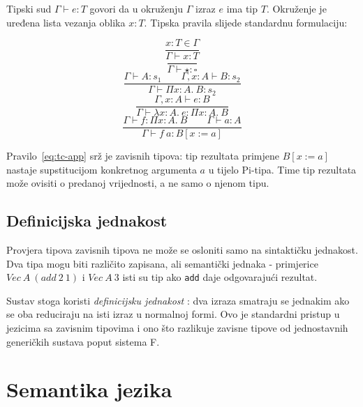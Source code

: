 \documentclass[diplomskirad,upload]{fer}
\begin{document}
Tipski sud \(\Gamma \vdash e : T\) govori da u okruženju \(\Gamma\) izraz
\(e\) ima tip \(T\). Okruženje je uređena lista vezanja oblika \(x : T\).
Tipska pravila slijede standardnu formulaciju:

\begin{equation}
    \frac{x : T \in \Gamma}{\Gamma \vdash x : T}
\end{equation}
\begin{equation}
    \frac{}{\Gamma \vdash \star : \square}
\end{equation}
\begin{equation}
    \frac{\Gamma \vdash A : s_1 \qquad \Gamma, x : A \vdash B : s_2}
         {\Gamma \vdash \Pi x : A.\ B : s_2}
\end{equation}
\begin{equation}
    \frac{\Gamma, x : A \vdash e : B}
         {\Gamma \vdash \lambda x : A.\ e : \Pi x : A.\ B}
\end{equation}
\begin{equation}
    \frac{\Gamma \vdash f : \Pi x : A.\ B \qquad \Gamma \vdash a : A}
         {\Gamma \vdash f\ a : B[x := a]}
    \label{eq:tc-app}
\end{equation}

Pravilo~\ref{eq:tc-app} srž je zavisnih tipova: tip rezultata primjene \(B[x
:= a]\) nastaje supstitucijom konkretnog argumenta \(a\) u tijelo Pi-tipa.
Time tip rezultata može ovisiti o predanoj vrijednosti, a ne samo o njenom
tipu.

\subsection{Definicijska jednakost}

Provjera tipova zavisnih tipova ne može se osloniti samo na sintaktičku
jednakost. Dva tipa mogu biti različito zapisana, ali semantički jednaka -
primjerice \(Vec\ A\ (add\ 2\ 1)\) i \(Vec\ A\ 3\) isti su tip ako
\texttt{add} daje odgovarajući rezultat.

Sustav stoga koristi \emph{definicijsku jednakost} :
dva izraza smatraju se jednakim ako se oba reduciraju na isti izraz u normalnoj
formi. Ovo je standardni pristup u jezicima sa zavisnim tipovima
\cite{coquand:inria-00076024} i ono što razlikuje zavisne tipove od
jednostavnih generičkih sustava poput sistema F.

\section{Semantika jezika}
\end{document}
